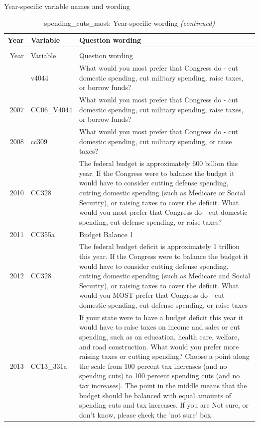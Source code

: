 \documentclass[12pt]{article}
\begin{document}
\endgroup{}

Year-specific variable names and wording

\begin{longtable}[t]{rl>{\raggedright\arraybackslash}p{10cm}}
\caption{\label{tab:unnamed-chunk-4}spending\_cuts\_most: Year-specific wording}\\
\toprule
Year & Variable & Question wording\\
\midrule
\endfirsthead
\caption[]{spending\_cuts\_most: Year-specific wording \textit{(continued)}}\\
\toprule
Year & Variable & Question wording\\
\midrule
\endhead
\
\endfoot
\bottomrule
\endlastfoot
2006 & v4044 & What would you most prefer that Congress do - cut domestic spending, cut military spending, raise taxes, or borrow funds?\\
2007 & CC06\_V4044 & What would you most prefer that Congress do - cut domestic spending, cut military spending, raise taxes, or borrow funds?\\
2008 & cc309 & What would you most prefer that Congress do - cut domestic spending, cut military spending, or raise taxes?\\
2010 & CC328 & The federal budget is approximately 600 billion this year. If the Congress were to balance the budget it would have to consider cutting defense spending, cutting domestic spending (such as Medicare or Social Security), or raising taxes to cover the deficit. What would you most prefer that Congress do - cut domestic spending, cut defense spending, or raise taxes?\\
2011 & CC355a & Budget Balance 1\\
2012 & CC328 & The federal budget deficit is approximately 1 trillion this year. If the Congress were to balance the budget it would have to consider cutting defense spending, cutting domestic spending (such as Medicare and Social Security), or raising taxes to cover the deficit. What would you MOST prefer that Congress do - cut domestic spending, cut defense spending, or raise taxes\\
2013 & CC13\_331a & If your state were to have a budget deficit this year it would have to raise taxes on income and sales or cut spending, such as on education, health care, welfare, and road construction. What would you prefer more raising taxes or cutting spending? Choose a point along the scale from 100 percent tax increases (and no spending cuts) to 100 percent spending cuts (and no tax increases). The point in the middle means that the budget should be balanced with equal amounts of spending cuts and tax increases. If you are Not sure, or don't know, please check the 'not sure' box.\\

\end{longtable}
\end{document}
